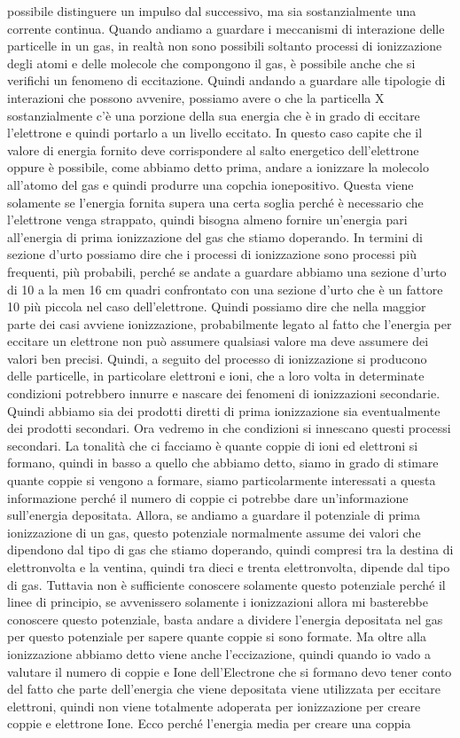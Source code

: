 {possibile distinguere un impulso dal successivo, ma sia sostanzialmente una corrente continua. Quando andiamo a guardare i meccanismi di interazione delle particelle in un gas, in realtà non sono possibili soltanto processi di ionizzazione degli atomi e delle molecole che compongono il gas, è possibile anche che si verifichi un fenomeno di eccitazione. Quindi andando a guardare alle tipologie di interazioni che possono avvenire, possiamo avere o che la particella X sostanzialmente c'è una porzione della sua energia che è in grado di eccitare l'elettrone e quindi portarlo a un livello eccitato. In questo caso capite che il valore di energia fornito deve corrispondere al salto energetico dell'elettrone oppure è possibile, come abbiamo detto prima, andare a ionizzare la molecolo all'atomo del gas e quindi produrre una copchia ionepositivo. Questa viene solamente se l'energia fornita supera una certa soglia perché è necessario che l'elettrone venga strappato, quindi bisogna almeno fornire un'energia pari all'energia di prima ionizzazione del gas che stiamo doperando. In termini di sezione d'urto possiamo dire che i processi di ionizzazione sono processi più frequenti, più probabili, perché se andate a guardare abbiamo una sezione d'urto di 10 a la men 16 cm quadri confrontato con una sezione d'urto che è un fattore 10 più piccola nel caso dell'elettrone. Quindi possiamo dire che nella maggior parte dei casi avviene ionizzazione, probabilmente legato al fatto che l'energia per eccitare un elettrone non può assumere qualsiasi valore ma deve assumere dei valori ben precisi. Quindi, a seguito del processo di ionizzazione si producono delle particelle, in particolare elettroni e ioni, che a loro volta in determinate condizioni potrebbero innurre e nascare dei fenomeni di ionizzazioni secondarie. Quindi abbiamo sia dei prodotti diretti di prima ionizzazione sia eventualmente dei prodotti secondari. Ora vedremo in che condizioni si innescano questi processi secondari. La tonalità che ci facciamo è quante coppie di ioni ed elettroni si formano, quindi in basso a quello che abbiamo detto, siamo in grado di stimare quante coppie si vengono a formare, siamo particolarmente interessati a questa informazione perché il numero di coppie ci potrebbe dare un'informazione sull'energia depositata. Allora, se andiamo a guardare il potenziale di prima ionizzazione di un gas, questo potenziale normalmente assume dei valori che dipendono dal tipo di gas che stiamo doperando, quindi compresi tra la destina di elettronvolta e la ventina, quindi tra dieci e trenta elettronvolta, dipende dal tipo di gas. Tuttavia non è sufficiente conoscere solamente questo potenziale perché il linee di principio, se avvenissero solamente i ionizzazioni allora mi basterebbe conoscere questo potenziale, basta andare a dividere l'energia depositata nel gas per questo potenziale per sapere quante coppie si sono formate. Ma oltre alla ionizzazione abbiamo detto viene anche l'eccizazione, quindi quando io vado a valutare il numero di coppie e Ione dell'Electrone che si formano devo tener conto del fatto che parte dell'energia che viene depositata viene utilizzata per eccitare elettroni, quindi non viene totalmente adoperata per ionizzazione per creare coppie e elettrone Ione. Ecco perché l'energia media per creare una coppia }
